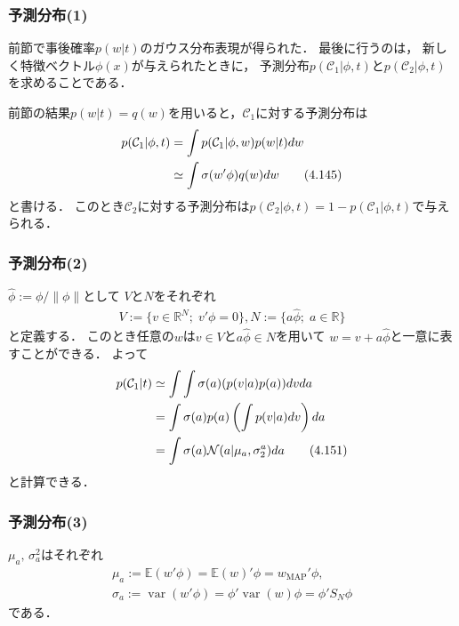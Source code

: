\documentclass[10pt,%
hyperref={unicode}]{beamer}
\DeclareMathOperator*{\var}{var}
\begin{document}
\begin{frame}
    \frametitle{予測分布(1)}
    前節で事後確率$p(w|t)$のガウス分布表現が得られた．
    最後に行うのは，
    新しく特徴ベクトル$\phi(x)$が与えられたときに，
    予測分布$p(\mathcal{C}_1|\phi,t)$と$p(\mathcal{C}_2|\phi,t)$を求めることである．

    \bigskip

    前節の結果$p(w|t)=q(w)$を用いると，$\mathcal{C}_1$に対する予測分布は
    \begin{align}
        p(\mathcal{C}_1|\phi,t) &= \int p(\mathcal{C}_1|\phi,w)p(w|t)dw \notag \\
                                &\simeq \int \sigma(w'\phi)q(w)dw \tag{4.145}
    \end{align}
    と書ける．
    このとき$\mathcal{C}_2$に対する予測分布は$p(\mathcal{C}_2|\phi,t) = 1 - p(\mathcal{C}_1|\phi,t)$で与えられる．

\end{frame}

\begin{frame}
    \frametitle{予測分布(2)}
    $\hat{\phi}:=\phi/\|\phi\|$として
    $V$と$N$をそれぞれ
    \begin{gather*}
        V := \{v \in \mathbb{R}^N;\; v'\phi =0 \},
        N := \{a\hat{\phi};\;a \in \mathbb{R}\}
    \end{gather*}
    と定義する．
    このとき任意の$w$は$v \in V$と$a\hat{\phi}\in N$を用いて
    $w = v + a\hat{\phi}$と一意に表すことができる．
    よって
    \begin{align}
        p(\mathcal{C}_1|t)
        &\simeq \int\int \sigma(a) (p(v|a)p(a))dvda \notag \\
        &= \int \sigma(a)p(a) \left(\int p(v|a) dv\right)da \notag \\
        &= \int \sigma(a)\mathcal{N}(a|\mu_a,\sigma_2^a)da \label{pc1t}
        \tag{4.151}
    \end{align}
    と計算できる．
\end{frame}

\begin{frame}
    \frametitle{予測分布(3)}
    $\mu_a,\,\sigma_a^2$はそれぞれ
    \begin{gather*}
        \mu_a := \mathbb{E}(w'\phi) = \mathbb{E}(w)'\phi = w_\mathrm{MAP}'\phi,\\
        \sigma_a := \var(w'\phi) = \phi'\var(w)\phi = \phi' S_N \phi
    \end{gather*}
    である．

\end{frame}
\end{document}

